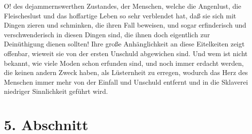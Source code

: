 O! des dejammernswerthen Zustandes, der Menschen, welche die Angenlust, die
Fleischeslust und das hoffartige Leben so sehr verblendet hat, daß sie sich mit
Dingen zieren und schminken, die ihren Fall beweisen, und sogar erfinderisch und
verschwenderisch in diesen Dingen sind, die ihnen doch eigentlich zur
Deinüthigung dienen sollten! Ihre große Anhänglichkeit an diese Eitelkeiten
zeigt offenbar, wieweit sie von der ersten Unschuld abgewichen sind. Und wem ist
nicht bekannt, wie viele Moden schon erfunden sind, und noch immer erdacht
werden, die keinen andern Zweck haben, als Lüsternheit zu erregen, wodurch das
Herz des Menschen immer mehr von der Einfall und Unschuld entfernt und in die
Sklaverei niedriger Sinnlichkeit geführt wird.

\section{5. Abschnitt}

